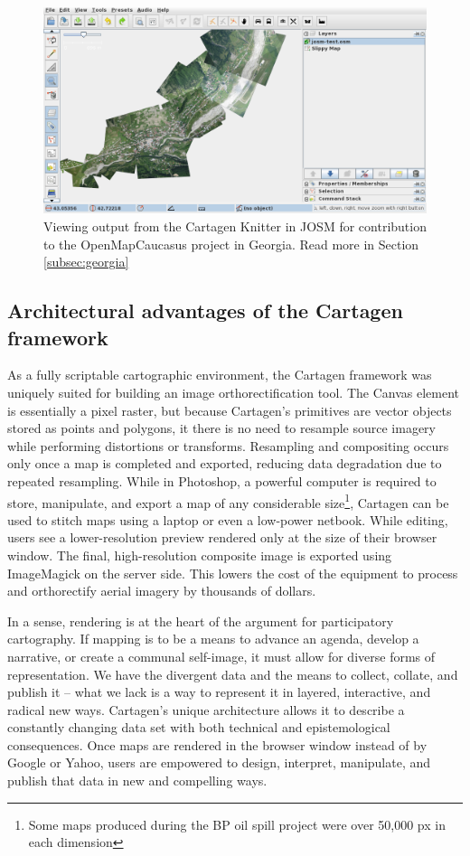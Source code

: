 \documentclass[11pt,oneside,notitlepage]{report}
\begin{document}
{{\begin{figure}[h]
  \begin{center}
	\includegraphics[width=1\textwidth]{images/knitter-josm.png}
	\caption{Viewing output from the Cartagen Knitter in \ac{JOSM} for contribution to the OpenMapCaucasus project in Georgia. Read more in Section \ref{subsec:georgia}}
  \end{center}
\end{figure}

\subsection{Architectural advantages of the Cartagen framework}

As a fully scriptable cartographic environment, the Cartagen framework was uniquely suited for building an image orthorectification tool. The Canvas element is essentially a pixel raster, but because Cartagen's primitives are vector objects stored as points and polygons, it there is no need to resample source imagery while performing distortions or transforms. Resampling and compositing occurs only once a map is completed and exported, reducing data degradation due to repeated resampling. While in Photoshop, a powerful computer is required to store, manipulate, and export a map of any considerable size\footnote{Some maps produced during the BP oil spill project were over 50,000 px in each dimension}, Cartagen can be used to stitch maps using a laptop or even a low-power netbook. While editing, users see a lower-resolution preview rendered only at the size of their browser window. The final, high-resolution composite image is exported using ImageMagick on the server side. This lowers the cost of the equipment to process and orthorectify aerial imagery by thousands of dollars. 

In a sense, rendering is at the heart of the argument for participatory cartography. If mapping is to be a means to advance an agenda, develop a narrative, or create a communal self-image, it must allow for diverse forms of representation. We have the divergent data and the means to collect, collate, and publish it – what we lack is a way to represent it in layered, interactive, and radical new ways. Cartagen's unique architecture allows it to describe a constantly changing data set with both technical and epistemological consequences. Once maps are rendered in the browser window instead of by Google or Yahoo, users are empowered to design, interpret, manipulate, and publish that data in new and compelling ways. 

}}
\end{document}
